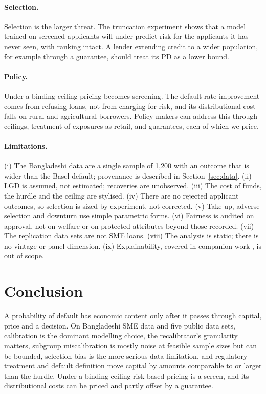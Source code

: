 \documentclass[11pt,a4paper]{article}
\begin{document}
\paragraph{Selection.} Selection is the larger threat. The truncation experiment shows that a model trained on screened applicants will under predict risk for the applicants it has never seen, with ranking intact. A lender extending credit to a wider population, for example through a guarantee, should treat its PD as a lower bound.

\paragraph{Policy.} Under a binding ceiling pricing becomes screening. The default rate improvement comes from refusing loans, not from charging for risk, and its distributional cost falls on rural and agricultural borrowers. Policy makers can address this through ceilings, treatment of exposures as retail, and guarantees, each of which we price.

\paragraph{Limitations.} (i) The Bangladeshi data are a single sample of 1{,}200 with an outcome that is wider than the Basel default; provenance is described in Section~\ref{sec:data}. (ii) LGD is assumed, not estimated; recoveries are unobserved. (iii) The cost of funds, the hurdle and the ceiling are stylised. (iv) There are no rejected applicant outcomes, so selection is sized by experiment, not corrected. (v) Take up, adverse selection and downturn use simple parametric forms. (vi) Fairness is audited on approval, not on welfare or on protected attributes beyond those recorded. (vii) The replication data sets are not SME loans. (viii) The analysis is static; there is no vintage or panel dimension. (ix) Explainability, covered in companion work \citep{Companion2026,CompanionFed2026}, is out of scope.

\section{Conclusion}\label{sec:conc}
A probability of default has economic content only after it passes through capital, price and a decision. On Bangladeshi SME data and five public data sets, calibration is the dominant modelling choice, the recalibrator's granularity matters, subgroup miscalibration is mostly noise at feasible sample sizes but can be bounded, selection bias is the more serious data limitation, and regulatory treatment and default definition move capital by amounts comparable to or larger than the hurdle. Under a binding ceiling risk based pricing is a screen, and its distributional costs can be priced and partly offset by a guarantee.
\end{document}

